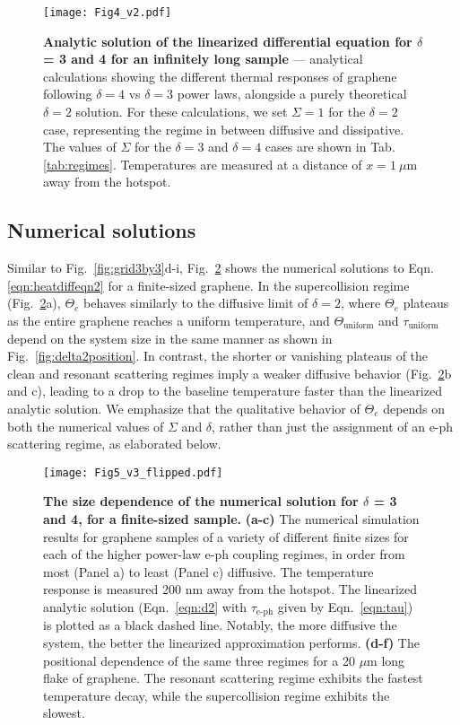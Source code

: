 \documentclass[aip, amsmath,amssymb, reprint]{revtex4-1}
\begin{document}
\begin{figure}\centering
\texttt{[image: Fig4\_v2.pdf]}
\caption{\textbf{Analytic solution of the linearized differential equation for $\delta$ = 3 and 4 for an infinitely long sample} --- analytical calculations showing the different thermal responses of graphene following $\delta = 4$ vs $\delta = 3$ power laws, alongside a purely theoretical $\delta = 2$ solution. For these calculations, we set $\Sigma = 1$ for the $\delta = 2$ case, representing the regime in between diffusive and dissipative. The values of $\Sigma$ for the $\delta = 3$ and $\delta = 4$ cases are shown in Tab. \ref{tab:regimes}. Temperatures are measured at a distance of $x = 1~\mu$m away from the hotspot.}
\label{fig:delta34linearTime}
\end{figure}

\subsection{Numerical solutions}

Similar to Fig.\ \ref{fig:grid3by3}d-i, Fig.\ \ref{fig:delta34size} shows the numerical solutions to Eqn. \ref{eqn:heatdiffeqn2} for a finite-sized graphene. In the supercollision regime (Fig.~\ref{fig:delta34size}a), $\Theta_e$ behaves similarly to the diffusive limit of $\delta = 2$, where $\Theta_e$ plateaus as the entire graphene reaches a uniform temperature, and $\Theta_{\text{uniform}}$ and $\tau_{\text{uniform}}$ depend on the system size in the same manner as shown in Fig.\ \ref{fig:delta2position}. In contrast, the shorter or vanishing plateaus of the clean and resonant scattering regimes imply a weaker diffusive behavior (Fig.\ \ref{fig:delta34size}b and c), leading to a drop to the baseline temperature faster than the linearized analytic solution. We emphasize that the qualitative behavior of $\Theta_e$ depends on both the numerical values of $\Sigma$ and $\delta$, rather than just the assignment of an e-ph scattering regime, as elaborated below.

\begin{figure}\centering
\texttt{[image: Fig5\_v3\_flipped.pdf]}
\caption{\textbf{The size dependence of the numerical solution for $\delta$ = 3 and 4, for a finite-sized sample.} \textbf{(a-c)} The numerical simulation results for graphene samples of a variety of different finite sizes for each of the higher power-law e-ph coupling regimes, in order from most (Panel a) to least (Panel c) diffusive. The temperature response is measured 200 nm away from the hotspot. The linearized analytic solution (Eqn.\ \ref{eqn:d2} with $\tau_{\text{e-ph}}$ given by Eqn.\ \ref{eqn:tau}) is plotted as a black dashed line. Notably, the more diffusive the system, the better the linearized approximation performs. \textbf{(d-f)} The positional dependence of the same three regimes for a 20 $\mu$m long flake of graphene. The resonant scattering regime exhibits the fastest temperature decay, while the supercollision regime exhibits the slowest.}
\label{fig:delta34size}
\end{figure}
\end{document}
